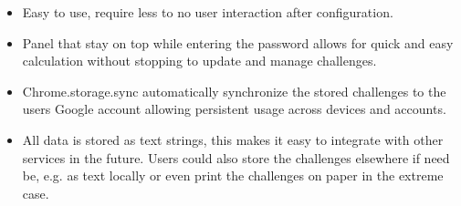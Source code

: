 \begin{itemize}
    \item Easy to use, require less to no user interaction after configuration.
    \item Panel that stay on top while entering the password allows for quick and easy calculation without stopping to update and manage challenges.
    \item Chrome.storage.sync automatically synchronize the stored challenges to the users Google account allowing persistent usage across devices and accounts.
    \item All data is stored as text strings, this makes it easy to integrate with other services in the future. Users could also store the challenges elsewhere if need be, e.g. as text locally or even print the challenges on paper in the extreme case.
\end{itemize}






